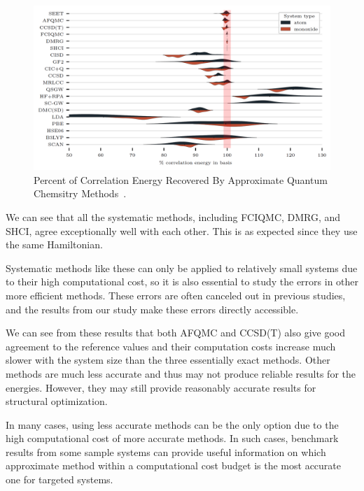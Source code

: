 \begin{figure}
  \begin{center}
  \includegraphics[width=\linewidth]{figs/benchmark.png}
  \caption{Percent of Correlation Energy Recovered By Approximate Quantum Chemsitry Methods~\cite{williams2019direct}.
}
  \label{fig:benchmark}
  \end{center}
\end{figure}

We can see that all the systematic methods, including FCIQMC, DMRG, and SHCI, agree exceptionally well with each other.
This is as expected since they use the same Hamiltonian.

Systematic methods like these can only be applied to relatively small systems due to their high computational cost, so it is also essential to study the errors in other more efficient methods.
These errors are often canceled out in previous studies, and the results from our study make these errors directly accessible.

We can see from these results that both AFQMC and CCSD(T) also give good agreement to the reference values and their computation costs increase much slower with the system size than the three essentially exact methods.
Other methods are much less accurate and thus may not produce reliable results for the energies.
However, they may still provide reasonably accurate results for structural optimization.

In many cases, using less accurate methods can be the only option due to the high computational cost of more accurate methods.
In such cases, benchmark results from some sample systems can provide useful information on which approximate method within a computational cost budget is the most accurate one for targeted systems.
